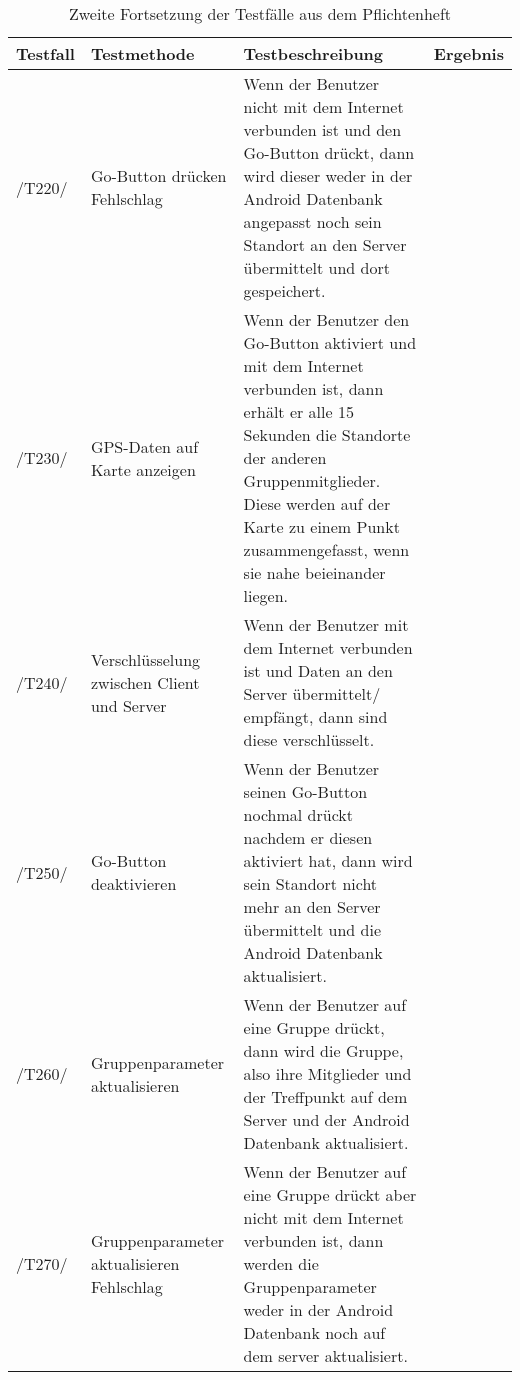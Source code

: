 	\begin{table}[H]
		{
			\begin{tabular}{|p{}||p{}|p{}|>{\centering}p{}|}
				\hline
				Testfall &Testmethode & Testbeschreibung & Ergebnis\tabularnewline
				\hline
				\hspace{0pt}/T220/ & Go-Button drücken Fehlschlag & Wenn der Benutzer nicht  mit dem Internet verbunden ist und den Go-Button drückt, dann wird dieser weder in der Android Datenbank angepasst noch sein Standort an den Server übermittelt und dort gespeichert. & \checkmark\tabularnewline
				\hspace{0pt}/T230/ & GPS-Daten auf Karte anzeigen & Wenn der Benutzer den Go-Button aktiviert und mit dem Internet verbunden ist, dann erhält er alle 15 Sekunden die Standorte der anderen Gruppenmitglieder. Diese werden auf der Karte zu einem Punkt zusammengefasst, wenn sie nahe beieinander liegen. & \checkmark\tabularnewline
				\hspace{0pt}/T240/ & Verschlüsselung zwischen Client und Server & Wenn der Benutzer mit dem Internet verbunden ist und Daten an den Server übermittelt/ empfängt, dann sind diese verschlüsselt. & \checkmark\tabularnewline
				\hspace{0pt}/T250/ & Go-Button deaktivieren & Wenn der Benutzer seinen Go-Button nochmal drückt nachdem er diesen aktiviert hat, dann wird sein Standort nicht mehr an den Server übermittelt und die Android Datenbank aktualisiert.& \checkmark\tabularnewline
				\hspace{0pt}/T260/ & Gruppenparameter aktualisieren & Wenn der Benutzer auf eine Gruppe drückt, dann wird die Gruppe, also ihre Mitglieder und der Treffpunkt auf dem Server und der Android Datenbank aktualisiert. & \checkmark\tabularnewline
				\hspace{0pt}/T270/ & Gruppenparameter aktualisieren Fehlschlag & Wenn der Benutzer auf eine Gruppe drückt aber nicht mit dem Internet verbunden ist, dann werden die Gruppenparameter weder in der Android Datenbank noch auf dem server aktualisiert. & \checkmark\tabularnewline
				\hline
			\end{tabular}}
			\caption{Zweite Fortsetzung der Testfälle aus dem Pflichtenheft}
	\end{table}



